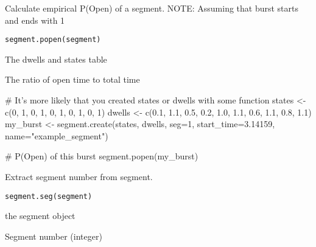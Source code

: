 \documentclass[letterpaper]{book}
\begin{document}
%
\begin{Description}\relax
Calculate empirical P(Open) of a segment. NOTE: Assuming that burst starts and ends with 1
\end{Description}
%
\begin{Usage}
\begin{verbatim}
segment.popen(segment)
\end{verbatim}
\end{Usage}
%
\begin{Arguments}
\begin{ldescription}
\item[\code{segment}] The dwells and states table
\end{ldescription}
\end{Arguments}
%
\begin{Value}
The ratio of open time to total time
\end{Value}
%
\begin{Examples}
\begin{ExampleCode}

# It's more likely that you created states or dwells with some function
states  <-  c(0,      1,    0,    1,    0,    1,    0,    1,    0,    1)
dwells  <-  c(0.1,  1.1,  0.5,  0.2,  1.0,  1.1,  0.6,  1.1,  0.8,  1.1)
my_burst <- segment.create(states, dwells, seg=1, start_time=3.14159, name="example_segment")

# P(Open) of this burst
segment.popen(my_burst)

\end{ExampleCode}
\end{Examples}
%
\begin{Description}\relax
Extract segment number from segment.
\end{Description}
%
\begin{Usage}
\begin{verbatim}
segment.seg(segment)
\end{verbatim}
\end{Usage}
%
\begin{Arguments}
\begin{ldescription}
\item[\code{segment}] the segment object
\end{ldescription}
\end{Arguments}
%
\begin{Value}
Segment number (integer)
\end{Value}
\end{document}
